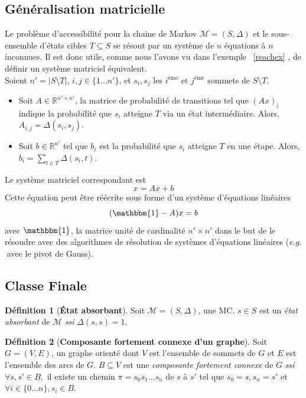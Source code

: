 \documentclass[12pt,a4paper]{report}
\theoremstyle{definition}%
\newtheorem{definition}{Définition}[chapter]
\theoremstyle{remark}
\newcommand{\eg}{\textit{e.g.} }
\newcommand{\ssi}{\textit{ssi} }
\let\labelitemi\labelitemii
\begin{document}
\subsection{Généralisation matricielle}
Le problème d'accessibilité pour la chaine de Markov $\mathcal{M} = (S, \Delta)$ et le sous-ensemble d'états cibles $T \subseteq S$ se résout par un système de $n$ équations à $n$ inconnues. Il est donc utile, comme nous l'avons vu dans l'exemple ~\ref{reachex} , de définir un système matriciel équivalent. \\
Soient $n' = |S \setminus T|$, $i, j \in \{1 \dots n'\}$, et $s_i, s_j$ les $i^{\text{ème}} \text{ et } j^{\text{ème}} $ sommets de $S \setminus T$. 
\begin{itemize}
\renewcommand{\labelitemi}{\tiny$\bullet$}
\item Soit $A \in \mathbb{R}^{n' \times n'}$, la matrice de probabilité de transitions tel que $(Ax)_{i}$ indique la probabilité que $s_i$ atteigne $T$ via un état intermédiaire. Alors, $A_{i,j} = \Delta(s_i, s_j)$.
\item Soit $b \in \mathbb{R}^{n'}$ tel que $b_{i}$ est la probabilité que $s_i$ atteigne $T$ en une étape. Alors, $b_i = \sum_{t \in T} \Delta(s_i, t)$.
\end{itemize}
Le système matriciel correspondant est
\[ x = Ax + b \]
Cette équation peut être réécrite sous forme d'un système d'équations linéaires
\[ (\mathbbm{1} - A) x = b \]
avec $\mathbbm{1}$, la matrice unité de cardinalité $n' \times n'$ dans le but de le résoudre avec des algorithmes de résolution de systèmes d'équations linéaires (\eg $\;$avec le pivot de Gauss).

\subsection{Classe Finale}
\begin{definition}[\textbf{\'Etat absorbant}]
	Soit $\mathcal{M} = (S, \Delta)$, une MC. $s \in S$ est un \textit{état absorbant} de $\mathcal{M}$ \ssi $\Delta(s, s) = 1$.
\end{definition}

\begin{definition}[\textbf{Composante fortement connexe d'un graphe}]
	Soit $G=(V, E)$, un graphe orienté dont $V$ est l'ensemble de sommets de $G$ et $E$ est l'ensemble des arcs de $G$. $B \subseteq V$ est une \textit{composante fortement connexe} de $G$ \ssi $\forall s,s' \in B,$ il existe un chemin $\pi = s_0 s_1 \dots s_n$ de $s$ à $s'$ tel que $s_0 = s , s_n = s'$ et $\forall i \in \{0 \dots n\}, s_i \in B$.
\end{definition}
\end{document}
